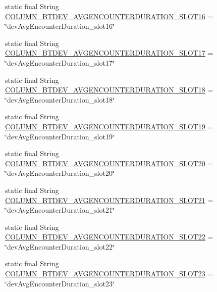 \begin{DoxyCompactItemize}
\item 
static final String \hyperlink{classcs_1_1usense_1_1db_1_1_usense_s_q_lite_helper_a9ca23e6d30282621a29e70ecddeaeb2c}{C\+O\+L\+U\+M\+N\+\_\+\+B\+T\+D\+E\+V\+\_\+\+A\+V\+G\+E\+N\+C\+O\+U\+N\+T\+E\+R\+D\+U\+R\+A\+T\+I\+O\+N\+\_\+\+S\+L\+O\+T16} = \char`\"{}dev\+Avg\+Encounter\+Duration\+\_\+slot16\char`\"{}
\item 
static final String \hyperlink{classcs_1_1usense_1_1db_1_1_usense_s_q_lite_helper_a017ea19c1e1ea505a615a5f7d8626db8}{C\+O\+L\+U\+M\+N\+\_\+\+B\+T\+D\+E\+V\+\_\+\+A\+V\+G\+E\+N\+C\+O\+U\+N\+T\+E\+R\+D\+U\+R\+A\+T\+I\+O\+N\+\_\+\+S\+L\+O\+T17} = \char`\"{}dev\+Avg\+Encounter\+Duration\+\_\+slot17\char`\"{}
\item 
static final String \hyperlink{classcs_1_1usense_1_1db_1_1_usense_s_q_lite_helper_a75cbdef7e3541ed44bbde609c34d0737}{C\+O\+L\+U\+M\+N\+\_\+\+B\+T\+D\+E\+V\+\_\+\+A\+V\+G\+E\+N\+C\+O\+U\+N\+T\+E\+R\+D\+U\+R\+A\+T\+I\+O\+N\+\_\+\+S\+L\+O\+T18} = \char`\"{}dev\+Avg\+Encounter\+Duration\+\_\+slot18\char`\"{}
\item 
static final String \hyperlink{classcs_1_1usense_1_1db_1_1_usense_s_q_lite_helper_ac4b28c428834acacd25150b92dbc7de8}{C\+O\+L\+U\+M\+N\+\_\+\+B\+T\+D\+E\+V\+\_\+\+A\+V\+G\+E\+N\+C\+O\+U\+N\+T\+E\+R\+D\+U\+R\+A\+T\+I\+O\+N\+\_\+\+S\+L\+O\+T19} = \char`\"{}dev\+Avg\+Encounter\+Duration\+\_\+slot19\char`\"{}
\item 
static final String \hyperlink{classcs_1_1usense_1_1db_1_1_usense_s_q_lite_helper_a22e363a4e5ae956b2e7496197befce57}{C\+O\+L\+U\+M\+N\+\_\+\+B\+T\+D\+E\+V\+\_\+\+A\+V\+G\+E\+N\+C\+O\+U\+N\+T\+E\+R\+D\+U\+R\+A\+T\+I\+O\+N\+\_\+\+S\+L\+O\+T20} = \char`\"{}dev\+Avg\+Encounter\+Duration\+\_\+slot20\char`\"{}
\item 
static final String \hyperlink{classcs_1_1usense_1_1db_1_1_usense_s_q_lite_helper_a95f34eac5300b609e313757f501d7334}{C\+O\+L\+U\+M\+N\+\_\+\+B\+T\+D\+E\+V\+\_\+\+A\+V\+G\+E\+N\+C\+O\+U\+N\+T\+E\+R\+D\+U\+R\+A\+T\+I\+O\+N\+\_\+\+S\+L\+O\+T21} = \char`\"{}dev\+Avg\+Encounter\+Duration\+\_\+slot21\char`\"{}
\item 
static final String \hyperlink{classcs_1_1usense_1_1db_1_1_usense_s_q_lite_helper_a3add17f0f8c13f067a5cf56bcbd63380}{C\+O\+L\+U\+M\+N\+\_\+\+B\+T\+D\+E\+V\+\_\+\+A\+V\+G\+E\+N\+C\+O\+U\+N\+T\+E\+R\+D\+U\+R\+A\+T\+I\+O\+N\+\_\+\+S\+L\+O\+T22} = \char`\"{}dev\+Avg\+Encounter\+Duration\+\_\+slot22\char`\"{}
\item 
static final String \hyperlink{classcs_1_1usense_1_1db_1_1_usense_s_q_lite_helper_accd80b5e38f8ae511fcca670906dff97}{C\+O\+L\+U\+M\+N\+\_\+\+B\+T\+D\+E\+V\+\_\+\+A\+V\+G\+E\+N\+C\+O\+U\+N\+T\+E\+R\+D\+U\+R\+A\+T\+I\+O\+N\+\_\+\+S\+L\+O\+T23} = \char`\"{}dev\+Avg\+Encounter\+Duration\+\_\+slot23\char`\"{}

\end{DoxyCompactItemize}
